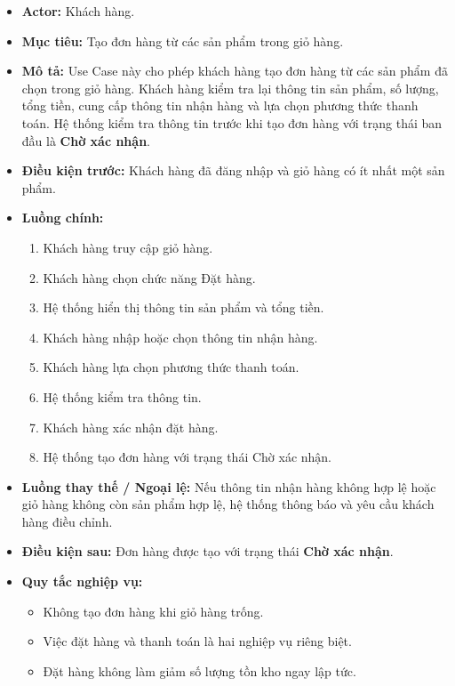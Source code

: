 \documentclass[12pt,a4paper]{article}
\begin{document}
\begin{itemize}

    \item \textbf{Actor:} Khách hàng.

    \item \textbf{Mục tiêu:} Tạo đơn hàng từ các sản phẩm trong giỏ hàng.

    \item \textbf{Mô tả:} Use Case này cho phép khách hàng tạo đơn hàng từ các sản phẩm đã chọn trong giỏ hàng. Khách hàng kiểm tra lại thông tin sản phẩm, số lượng, tổng tiền, cung cấp thông tin nhận hàng và lựa chọn phương thức thanh toán. Hệ thống kiểm tra thông tin trước khi tạo đơn hàng với trạng thái ban đầu là \textbf{Chờ xác nhận}.

    \item \textbf{Điều kiện trước:} Khách hàng đã đăng nhập và giỏ hàng có ít nhất một sản phẩm.

    \item \textbf{Luồng chính:}
    \begin{enumerate}
        \item Khách hàng truy cập giỏ hàng.
        \item Khách hàng chọn chức năng Đặt hàng.
        \item Hệ thống hiển thị thông tin sản phẩm và tổng tiền.
        \item Khách hàng nhập hoặc chọn thông tin nhận hàng.
        \item Khách hàng lựa chọn phương thức thanh toán.
        \item Hệ thống kiểm tra thông tin.
        \item Khách hàng xác nhận đặt hàng.
        \item Hệ thống tạo đơn hàng với trạng thái Chờ xác nhận.
    \end{enumerate}

    \item \textbf{Luồng thay thế / Ngoại lệ:} Nếu thông tin nhận hàng không hợp lệ hoặc giỏ hàng không còn sản phẩm hợp lệ, hệ thống thông báo và yêu cầu khách hàng điều chỉnh.

    \item \textbf{Điều kiện sau:} Đơn hàng được tạo với trạng thái \textbf{Chờ xác nhận}.

    \item \textbf{Quy tắc nghiệp vụ:}
    \begin{itemize}
        \item Không tạo đơn hàng khi giỏ hàng trống.
        \item Việc đặt hàng và thanh toán là hai nghiệp vụ riêng biệt.
        \item Đặt hàng không làm giảm số lượng tồn kho ngay lập tức.
    \end{itemize}

\end{itemize}
\end{document}

